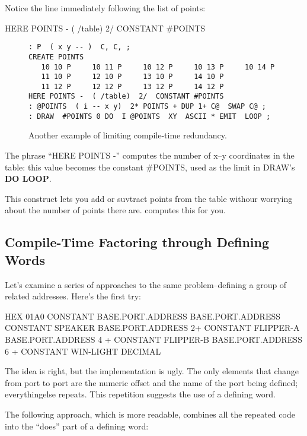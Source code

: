 Notice the line immediately following the list of points:

\begin{Code}
HERE POINTS -  ( /table)  2/  CONSTANT #POINTS
\end{Code}
\begin{figure*}[bbbb]
\caption{Another example of limiting compile-time redundancy.}
\begin{center}
\begin{BVerbatim}
: P  ( x y -- )  C, C, ;
CREATE POINTS
   10 10 P     10 11 P     10 12 P     10 13 P     10 14 P
   11 10 P     12 10 P     13 10 P     14 10 P
   11 12 P     12 12 P     13 12 P     14 12 P
HERE POINTS -  ( /table)  2/  CONSTANT #POINTS
: @POINTS  ( i -- x y)  2* POINTS + DUP 1+ C@  SWAP C@ ;
: DRAW  #POINTS 0 DO  I @POINTS  XY  ASCII * EMIT  LOOP ;
\end{BVerbatim}
\end{center}
\end{figure*}
The phrase ``HERE POINTS -'' computes the number of x--y coordinates in the table: this value becomes the constant \#POINTS, used as the limit in DRAW's \textbf{DO LOOP}.

This construct lets you add or suvtract points from the table withour worrying about the number of points there are. \Forth{} computes this for you.

\subsection{{Compile-Time Factoring through Defining Words}}%
%
Let's examine a series of approaches to the same problem--defining a
group of related addresses. Here's the first try:

\begin{Code}
HEX 01A0 CONSTANT BASE.PORT.ADDRESS
BASE.PORT.ADDRESS CONSTANT SPEAKER
BASE.PORT.ADDRESS 2+ CONSTANT FLIPPER-A
BASE.PORT.ADDRESS 4 + CONSTANT FLIPPER-B
BASE.PORT.ADDRESS 6 + CONSTANT WIN-LIGHT
DECIMAL
\end{Code}
The idea is right, but the implementation is ugly. The only elements that change from port to port are the numeric offset and the name of the port being defined; everythingelse repeats. This repetition suggests the use of a defining word.

The following approach, which is more readable, combines all the repeated code into the ``does'' part  of a defining word:

